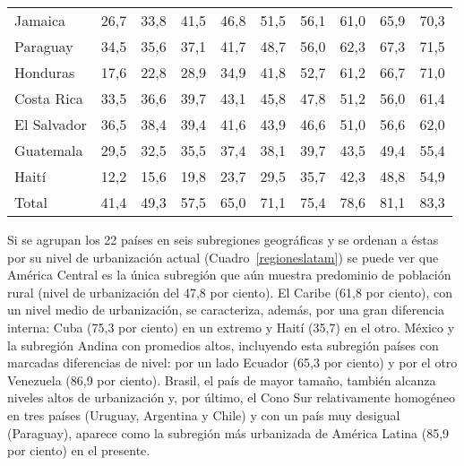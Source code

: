 \begin{table}
\begin{tabular}{|llllllllll|}
  Jamaica &26,7 &33,8 &41,5 &46,8 &51,5 &56,1 &61,0 &65,9 &70,3\\ 
  Paraguay &34,5 &35,6 &37,1 &41,7 &48,7 &56,0 &62,3 &67,3 &71,5\\ 
  Honduras &17,6 &22,8 &28,9 &34,9 &41,8 &52,7 &61,2 &66,7 &71,0\\ 
  Costa Rica &33,5 &36,6 &39,7 &43,1 &45,8 &47,8 &51,2 &56,0 &61,4\\ 
  El Salvador &36,5 &38,4 &39,4 &41,6 &43,9 &46,6 &51,0 &56,6 &62,0\\ 
  Guatemala &29,5 &32,5 &35,5 &37,4 &38,1 &39,7 &43,5 &49,4 &55,4\\ 
  Haití &12,2 &15,6 &19,8 &23,7 &29,5 &35,7 &42,3 &48,8 &54,9\\ 
  Total &41,4 &49,3 &57,5 &65,0 &71,1 &75,4 &78,6 &81,1 &83,3 \\
  \hline
  \end{tabular}
\end{table}

Si se agrupan los 22 países en seis subregiones geográficas y se ordenan a
éstas por su nivel de urbanización actual (Cuadro~\ref{regioneslatam}) se puede ver que América
Central es la única subregión que aún muestra predominio de población rural
(nivel de urbanización del 47,8 por ciento). El Caribe (61,8 por ciento),
con un nivel medio de urbanización, se caracteriza, además, por una gran diferencia
interna: Cuba (75,3 por ciento) en un extremo y Haití (35,7) en el
otro. México y la subregión Andina con promedios altos, incluyendo esta subregión 
países con marcadas diferencias de nivel: por un lado Ecuador (65,3
por ciento) y por el otro Venezuela (86,9 por ciento). Brasil, el país de mayor
tamaño, también alcanza niveles altos de urbanización y, por último, el Cono
Sur relativamente homogéneo en tres países (Uruguay, Argentina y Chile) y
con un país muy desigual (Paraguay), aparece como la subregión más urbanizada
de América Latina (85,9 por ciento) en el presente.

